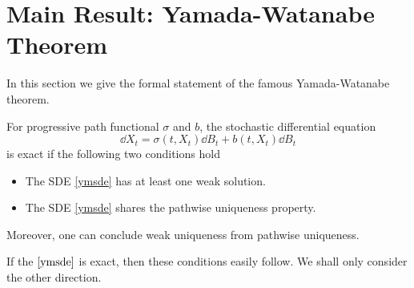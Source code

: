 \documentclass[8pt,onesided]{article}
\begin{document}



\section{Main Result: Yamada-Watanabe Theorem}

In this section we give the formal statement of the famous Yamada-Watanabe theorem.

\begin{theorem} 
    \label{ym} For progressive path functional $\sigma$ and $b$, the stochastic differential equation
    \begin{equation*}
        \dd X_t=\sigma(t,X_t)\dd B_t+b(t,X_t) \dd B_t \label{ymsde}
    \end{equation*}
    is exact if the following two conditions hold
    \begin{itemize}
        \item The SDE \ref{ymsde} has at least one weak solution.
        \item The SDE \ref{ymsde} shares the pathwise uniqueness property.
    \end{itemize}
    Moreover, one can conclude weak uniqueness from pathwise uniqueness. 
\end{theorem}

If the $\ref{ymsde}$ is exact, then these conditions easily follow. We shall only consider the other direction. 
\end{document}
